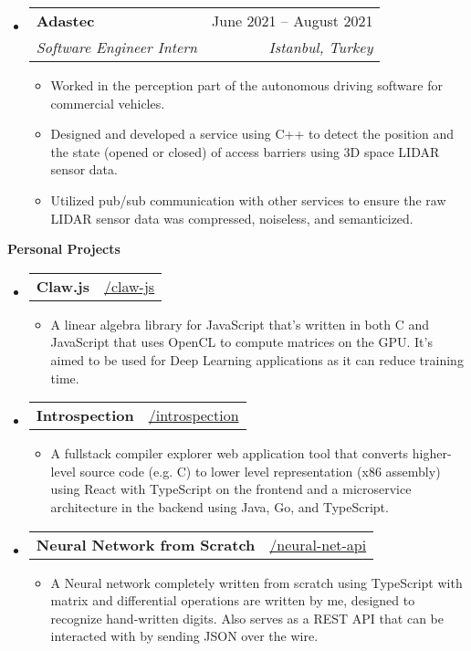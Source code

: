 \documentclass[letterpaper,12pt]{article}[leftmargin=*]
\makeatletter
\def \githubicon {\faGithub}
\def \entryspacing {-0pt}
\renewcommand{\section}[2]{\vspace{5pt}
  \colorbox{secondary}{\color{white}\raggedbottom\normalsize\textbf{{#1}{\hspace{7pt}#2}}}
}
\newcommand{\resumeEntryStart}{\begin{itemize}[leftmargin=2.5mm]}
\newcommand{\resumeEntryEnd}{\end{itemize}\vspace{\entryspacing}}
\newcommand{\resumeItemListStart}{\begin{itemize}[leftmargin=4.5mm]}
\newcommand{\resumeItemListEnd}{\end{itemize}}
\newcommand{\resumeItem}[1]{
  \item\small{
    {#1 \vspace{-2pt}}
  }
}
\newcommand{\resumeEntryTSDL}[4]{
  \vspace{-1pt}\item[]
    \begin{tabularx}{0.97\textwidth}{X@{\hspace{60pt}}r}
      \textbf{\color{primary}#1} & {\firabook\color{accent}\small#2} \\
      \textit{\color{accent}\small#3} & \textit{\color{accent}\small#4} \\
    \end{tabularx}\vspace{-6pt}
}
\newcommand{\resumeEntryTD}[2]{
  \vspace{-1pt}\item[]
    \begin{tabularx}{0.97\textwidth}{X@{\hspace{60pt}}r}
      \textbf{\color{primary}#1} & {\firabook\color{accent}\small#2} \\
    \end{tabularx}\vspace{-6pt}
}
\makeatother
\begin{document}
  \resumeEntryStart
    \resumeEntryTSDL
      {Adastec}{June 2021 -- August 2021}
      {Software Engineer Intern}{Istanbul, Turkey}
    \resumeItemListStart
      \resumeItem {Worked in the perception part of the autonomous driving software for commercial vehicles.}
      \resumeItem {Designed and developed a service using C++ to detect the position and the state (opened or closed) of access barriers using 3D space LIDAR sensor data.}
      \resumeItem {Utilized pub/sub communication with other services to ensure the raw LIDAR sensor data was compressed, noiseless, and semanticized.}
    \resumeItemListEnd
  \resumeEntryEnd


\section{\faFlask}{Personal Projects}

  \resumeEntryStart
    \resumeEntryTD
      {Claw.js}{\githubicon \href{https://github.com/tussoftwaredesign/claw-js}{ /claw-js}}
    \resumeItemListStart
      \resumeItem {A linear algebra library for JavaScript that's written in both C and JavaScript that uses OpenCL to compute matrices on the GPU. It's aimed to be used for Deep Learning applications as it can reduce training time.}
    \resumeItemListEnd
  \resumeEntryEnd

  \pagebreak

  \resumeEntryStart
    \resumeEntryTD
      {Introspection}{\githubicon \href{https://github.com/yvesyil/introspection}{ /introspection}}
    \resumeItemListStart
      \resumeItem {A fullstack compiler explorer web application tool that converts higher-level source code (e.g. C) to lower level representation (x86 assembly) using React with TypeScript on the frontend and a microservice architecture in the backend using Java, Go, and TypeScript.}
    \resumeItemListEnd
  \resumeEntryEnd

  \resumeEntryStart
    \resumeEntryTD
      {Neural Network from Scratch}{\githubicon \href{https://github.com/yvesyil/neural-net-api}{ /neural-net-api}}
    \resumeItemListStart
      \resumeItem {A Neural network completely written from scratch using TypeScript with matrix and differential operations are written by me, designed to recognize hand-written digits. Also serves as a REST API that can be interacted with by sending JSON over the wire.}
    \resumeItemListEnd
  \resumeEntryEnd
\end{document}

